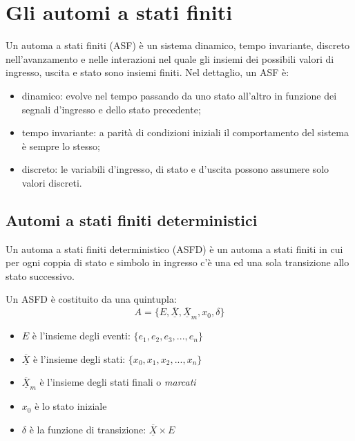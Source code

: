 \documentclass[a4paper]{report}
\begin{document}
\section{Gli automi a stati finiti}
Un automa a stati finiti (ASF) \`e un sistema dinamico, tempo invariante,
discreto nell'avanzamento e nelle interazioni nel quale gli insiemi
dei possibili valori di ingresso, uscita e stato sono insiemi finiti.
Nel dettaglio, un ASF \`e:
\begin{itemize}
\item dinamico: evolve nel tempo passando da uno stato all'altro in
  funzione dei segnali d'ingresso e dello stato precedente;
\item tempo invariante: a parit\`a di condizioni iniziali il
  comportamento del sistema \`e sempre lo stesso;
\item discreto: le variabili d'ingresso, di stato e d'uscita possono
  assumere solo valori discreti.
\end{itemize}

\subsection{Automi a stati finiti deterministici}
Un automa a stati finiti deterministico (ASFD) \`e un automa a stati
finiti in cui per ogni coppia di stato e simbolo in ingresso c'\`e una
ed una sola transizione allo stato successivo.

Un ASFD \`e costituito da una quintupla:
\begin{equation}
  A = \{ E, \overline{\underline{X}}, \overline{\underline{X}}_m, x_0,
  \delta \}
\end{equation}
\begin{itemize}
\item $E$ \`e l'insieme degli eventi: $\{ e_1, e_2, e_3, ..., e_n\}$
\item $\overline{\underline{X}}$ \`e l'insieme degli stati: $\{ x_0, x_1,
  x_2, ..., x_n\}$
\item $\overline{\underline{X}}_m$ \`e l'insieme degli stati finali o {\em
  marcati}
\item $x_0$ \`e lo stato iniziale
\item $\delta$ \`e la funzione di transizione: $\overline{\underline{X}}
  \times E$
\end{itemize}
\end{document}
